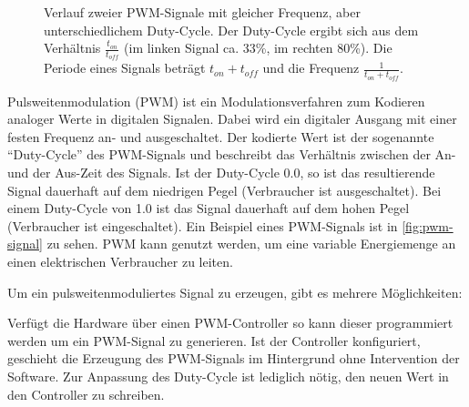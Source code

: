 \documentclass[german]{thesis_KBS}
\begin{document}
\begin{figure}[h]
    \centering
    \caption{Verlauf zweier PWM-Signale mit gleicher Frequenz, aber
        unterschiedlichem Duty-Cycle. Der Duty-Cycle ergibt sich aus dem
        Verhältnis $\frac{t_{on}}{t_{off}}$ (im linken Signal ca. 33\%, im
        rechten 80\%). Die Periode eines Signals beträgt $t_{on} + t_{off}$ und
        die Frequenz $\frac{1}{t_{on} + t_{off}}$.}
    \label{fig:pwm-signal}
\end{figure}


Pulsweitenmodulation (PWM) ist ein Modulationsverfahren zum Kodieren analoger
Werte in digitalen Signalen. Dabei wird ein digitaler Ausgang mit einer festen
Frequenz an- und ausgeschaltet. Der kodierte Wert ist der sogenannte
"`Duty-Cycle"' des PWM-Signals und beschreibt das Verhältnis zwischen der An-
und der Aus-Zeit des Signals. Ist der Duty-Cycle 0.0, so ist das resultierende
Signal dauerhaft auf dem niedrigen Pegel (Verbraucher ist ausgeschaltet). Bei
einem Duty-Cycle von 1.0 ist das Signal dauerhaft auf dem hohen Pegel
(Verbraucher ist eingeschaltet). Ein Beispiel eines PWM-Signals ist in
\autoref{fig:pwm-signal} zu sehen. PWM kann genutzt werden, um eine variable
Energiemenge an einen elektrischen Verbraucher zu leiten.

Um ein pulsweitenmoduliertes Signal zu erzeugen, gibt es mehrere Möglichkeiten:

Verfügt die Hardware über einen PWM-Controller so kann dieser programmiert
werden um ein PWM-Signal zu generieren. Ist der Controller konfiguriert,
geschieht die Erzeugung des PWM-Signals im Hintergrund ohne Intervention der
Software. Zur Anpassung des Duty-Cycle ist lediglich nötig, den neuen Wert in
den Controller zu schreiben.
\end{document}
